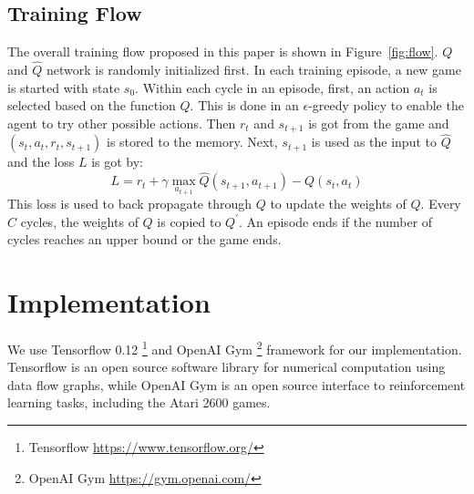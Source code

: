 \documentclass[10pt,twocolumn,letterpaper]{article}
\begin{document}
\begin{CJK}{UTF8}{gbsn}
\subsection{Training Flow}

The overall training flow proposed in this paper is shown in Figure~\ref{fig:flow}. $Q$ and $\hat{Q}$ network is randomly initialized first. In each training episode, a new game is started with state $s_0$. Within each cycle in an episode, first, an action $a_t$ is selected based on the function $Q$. This is done in an $\epsilon$-greedy policy to enable the agent to try other possible actions. Then $r_t$ and $s_{t+1}$ is got from the game and $(s_t, a_t, r_t, s_{t+1})$ is stored to the memory. Next, $s_{t+1}$ is used as the input to $\hat{Q}$ and the loss $L$ is got by:
\[
    L = r_t+\gamma \max\limits_{a_{t+1}} \hat{Q}(s_{t+1}, a_{t+1}) - Q(s_t, a_t)
\]
This loss is used to back propagate through $Q$ to update the weights of $Q$. Every $C$ cycles, the weights of $Q$ is copied to $Q^\prime$. An episode ends if the number of cycles reaches an upper bound or the game ends.



\section{Implementation}

We use Tensorflow 0.12 \footnote{Tensorflow \url{https://www.tensorflow.org/}} and OpenAI Gym \footnote{OpenAI Gym \url{https://gym.openai.com/}} framework for our implementation. Tensorflow is an open source software library for numerical computation using data flow graphs, while OpenAI Gym is an open source interface to reinforcement learning tasks, including the Atari 2600 games.


\end{CJK}
\end{document}
